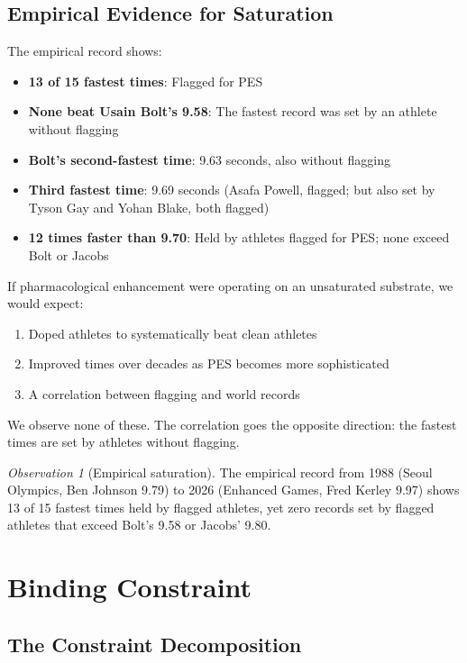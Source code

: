 \documentclass[11pt,twocolumn]{article}
\theoremstyle{definition}
\theoremstyle{remark}
\newtheorem{observation}[theorem]{Observation}
\begin{document}
\subsection{Empirical Evidence for Saturation}

The empirical record shows:
\begin{itemize}[leftmargin=1.2em]
\item \textbf{13 of 15 fastest times}: Flagged for PES
\item \textbf{None beat Usain Bolt's 9.58}: The fastest record was set by an athlete without flagging
\item \textbf{Bolt's second-fastest time}: 9.63 seconds, also without flagging
\item \textbf{Third fastest time}: 9.69 seconds (Asafa Powell, flagged; but also set by Tyson Gay and Yohan Blake, both flagged)
\item \textbf{12 times faster than 9.70}: Held by athletes flagged for PES; none exceed Bolt or Jacobs
\end{itemize}

If pharmacological enhancement were operating on an unsaturated substrate, we would expect:
\begin{enumerate}[leftmargin=1.2em]
\item Doped athletes to systematically beat clean athletes
\item Improved times over decades as PES becomes more sophisticated
\item A correlation between flagging and world records
\end{enumerate}

We observe none of these. The correlation goes the opposite direction: the fastest times are set by athletes without flagging.

\begin{observation}[Empirical saturation]
The empirical record from 1988 (Seoul Olympics, Ben Johnson 9.79) to 2026 (Enhanced Games, Fred Kerley 9.97) shows 13 of 15 fastest times held by flagged athletes, yet zero records set by flagged athletes that exceed Bolt's 9.58 or Jacobs' 9.80.
\end{observation}

\section{Binding Constraint}
\label{sec:binding}

\subsection{The Constraint Decomposition}
\end{document}
